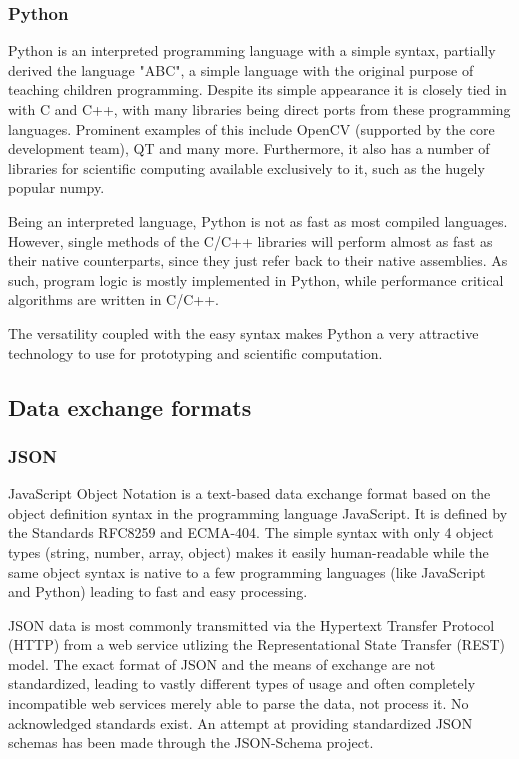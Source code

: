 \documentclass[BSA,Bachelor,english]{twbook}%
\begin{document}
\subsubsection{Python}
Python\cite{PYTH} is an interpreted programming language with a simple syntax, partially derived the language "ABC", a simple language with the original purpose of teaching children programming. Despite its simple appearance it is closely tied in with C and C++, with many libraries being direct ports from these programming languages. Prominent examples of this include OpenCV (supported by the core development team), QT and many more. Furthermore, it also has a number of libraries for scientific computing available exclusively to it, such as the hugely popular numpy.

Being an interpreted language, Python is not as fast as most compiled languages. However, single methods of the C/C++ libraries will perform almost as fast as their native counterparts, since they just refer back to their native assemblies. As such, program logic is mostly implemented in Python, while performance critical algorithms are written in C/C++.

The versatility coupled with the easy syntax makes Python a very attractive technology to use for prototyping and scientific computation.

\subsection{Data exchange formats}

\subsubsection{JSON}

JavaScript Object Notation is a text-based data exchange format based on the object definition syntax in the programming language JavaScript. It is defined by the Standards RFC8259\cite{RFC8259} and ECMA-404\cite{ECMA404}. The simple syntax with only 4 object types (string, number, array, object) makes it easily human-readable while the same object syntax is native to a few programming languages (like JavaScript and Python) leading to fast and easy processing.

JSON data is most commonly transmitted via the Hypertext Transfer Protocol (HTTP) from a web service utlizing the Representational State Transfer (REST) model. The exact format of JSON and the means of exchange are not standardized, leading to vastly different types of usage and often completely incompatible web services merely able to parse the data, not process it. No acknowledged standards exist. An attempt at providing standardized JSON schemas has been made through the JSON-Schema project\cite{JSON_SCHEMA}.
\end{document}
